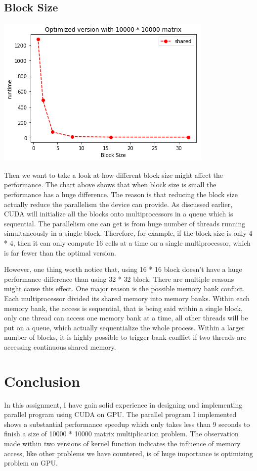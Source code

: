 \documentclass{cs4444}
\begin{document}
\subsection{Block Size}
\begin{center}
	\includegraphics{block}
\end{center}
Then we want to take a look at how different block size might affect the performance. The chart above shows that when block size is small the performance has a huge difference. The reason is that reducing the block size actually reduce the parallelism the device can provide. As discussed earlier, CUDA will initialize all the blocks onto multiprocessors in a queue which is sequential. The parallelism one can get is from huge number of threads running simultaneously in a single block. Therefore, for example, if the block size is only 4 * 4, then it can only compute 16 cells at a time on a single multiprocessor, which is far fewer than the optimal version.

However, one thing worth notice that, using 16 * 16 block doesn't have a huge performance difference than using 32 * 32 block. There are multiple reasons might cause this effect. One major reason is the possible memory bank conflict. Each multiprocessor divided its shared memory into memory banks. Within each memory bank, the access is sequential, that is being said within a single block, only one thread can access one memory bank at a time, all other threads will be put on a queue, which actually sequentialize the whole process. Within a larger number of blocks, it is highly possible to trigger bank conflict if two threads are accessing continuous shared memory. 

\section{Conclusion}
In this assignment, I have gain solid experience in designing and implementing parallel program using CUDA on GPU. The parallel program I implemented shows a substantial performance speedup which only takes less than 9 seconds to finish a size of 10000 * 10000 matrix multiplication problem. The observation made within two versions of kernel function indicates the influence of memory access, like other problems we have countered, is of huge importance is optimizing problem on GPU. 
\end{document}
